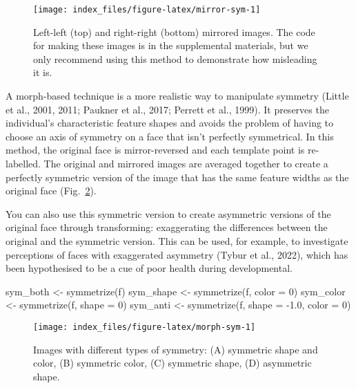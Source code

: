 \documentclass[
  doc,floatsintext]{apa6}
\newenvironment{Shaded}{\begin{snugshade}}{\end{snugshade}}
\newcommand{\AttributeTok}[1]{\textcolor[rgb]{0.77,0.63,0.00}{#1}}
\newcommand{\DecValTok}[1]{\textcolor[rgb]{0.00,0.00,0.81}{#1}}
\newcommand{\FloatTok}[1]{\textcolor[rgb]{0.00,0.00,0.81}{#1}}
\newcommand{\FunctionTok}[1]{\textcolor[rgb]{0.00,0.00,0.00}{#1}}
\newcommand{\NormalTok}[1]{#1}
\newcommand{\OtherTok}[1]{\textcolor[rgb]{0.56,0.35,0.01}{#1}}
\newcommand{\SpecialCharTok}[1]{\textcolor[rgb]{0.00,0.00,0.00}{#1}}
\begin{document}
\begin{figure}
\texttt{[image: index\_files/figure-latex/mirror-sym-1]} \caption{Left-left (top) and right-right (bottom) mirrored images. The code for making these images is in the supplemental materials, but we only recommend using this method to demonstrate how misleading it is.}\label{fig:mirror-sym}
\end{figure}

A morph-based technique is a more realistic way to manipulate symmetry (Little et al., 2001, 2011; Paukner et al., 2017; Perrett et al., 1999). It preserves the individual's characteristic feature shapes and avoids the problem of having to choose an axis of symmetry on a face that isn't perfectly symmetrical. In this method, the original face is mirror-reversed and each template point is re-labelled. The original and mirrored images are averaged together to create a perfectly symmetric version of the image that has the same feature widths as the original face (Fig.~\ref{fig:morph-sym}).

You can also use this symmetric version to create asymmetric versions of the original face through transforming: exaggerating the differences between the original and the symmetric version. This can be used, for example, to investigate perceptions of faces with exaggerated asymmetry (Tybur et al., 2022), which has been hypothesised to be a cue of poor health during developmental.

\begin{Shaded}
\begin{Highlighting}[]
\NormalTok{sym\_both }\OtherTok{\textless{}{-}} \FunctionTok{symmetrize}\NormalTok{(f)}
\NormalTok{sym\_shape }\OtherTok{\textless{}{-}} \FunctionTok{symmetrize}\NormalTok{(f, }\AttributeTok{color =} \DecValTok{0}\NormalTok{)}
\NormalTok{sym\_color }\OtherTok{\textless{}{-}} \FunctionTok{symmetrize}\NormalTok{(f, }\AttributeTok{shape =} \DecValTok{0}\NormalTok{)}
\NormalTok{sym\_anti }\OtherTok{\textless{}{-}} \FunctionTok{symmetrize}\NormalTok{(f, }\AttributeTok{shape =} \SpecialCharTok{{-}}\FloatTok{1.0}\NormalTok{, }\AttributeTok{color =} \DecValTok{0}\NormalTok{)}
\end{Highlighting}
\end{Shaded}

\begin{figure}
\texttt{[image: index\_files/figure-latex/morph-sym-1]} \caption{Images with different types of symmetry: (A) symmetric shape and color, (B) symmetric color, (C) symmetric shape, (D) asymmetric shape.}\label{fig:morph-sym}
\end{figure}
\end{document}
